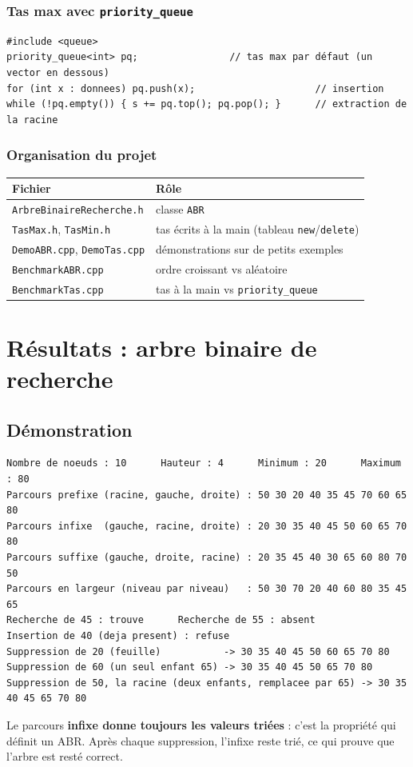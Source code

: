 \documentclass[12pt,a4paper]{report}
\begin{document}
\subsection{Tas max avec \texttt{priority\_queue}}
\begin{lstlisting}
#include <queue>
priority_queue<int> pq;                // tas max par défaut (un vector en dessous)
for (int x : donnees) pq.push(x);                     // insertion
while (!pq.empty()) { s += pq.top(); pq.pop(); }      // extraction de la racine
\end{lstlisting}

\subsection{Organisation du projet}
\begin{center}
\begin{tabular}{ll}
  \toprule
  Fichier & Rôle \\
  \midrule
  \texttt{ArbreBinaireRecherche.h} & classe \texttt{ABR} \\
  \texttt{TasMax.h}, \texttt{TasMin.h} & tas écrits à la main (tableau \texttt{new}/\texttt{delete}) \\
  \texttt{DemoABR.cpp}, \texttt{DemoTas.cpp} & démonstrations sur de petits exemples \\
  \texttt{BenchmarkABR.cpp} & ordre croissant vs aléatoire \\
  \texttt{BenchmarkTas.cpp} & tas à la main vs \texttt{priority\_queue} \\
  \bottomrule
\end{tabular}
\end{center}

\chapter{Résultats : arbre binaire de recherche}

\section{Démonstration}
\begin{lstlisting}[style=sortie]
Nombre de noeuds : 10      Hauteur : 4      Minimum : 20      Maximum : 80
Parcours prefixe (racine, gauche, droite) : 50 30 20 40 35 45 70 60 65 80
Parcours infixe  (gauche, racine, droite) : 20 30 35 40 45 50 60 65 70 80
Parcours suffixe (gauche, droite, racine) : 20 35 45 40 30 65 60 80 70 50
Parcours en largeur (niveau par niveau)   : 50 30 70 20 40 60 80 35 45 65
Recherche de 45 : trouve      Recherche de 55 : absent
Insertion de 40 (deja present) : refuse
Suppression de 20 (feuille)           -> 30 35 40 45 50 60 65 70 80
Suppression de 60 (un seul enfant 65) -> 30 35 40 45 50 65 70 80
Suppression de 50, la racine (deux enfants, remplacee par 65) -> 30 35 40 45 65 70 80
\end{lstlisting}
Le parcours \textbf{infixe donne toujours les valeurs triées} : c'est la propriété qui définit un ABR. Après chaque suppression, l'infixe reste trié, ce qui prouve que l'arbre est resté correct.
\end{document}
